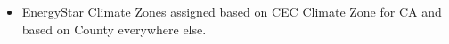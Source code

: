 \begin{itemize}
\item EnergyStar Climate Zones assigned based on CEC Climate Zone for CA and based on County everywhere else.
\end{itemize}
